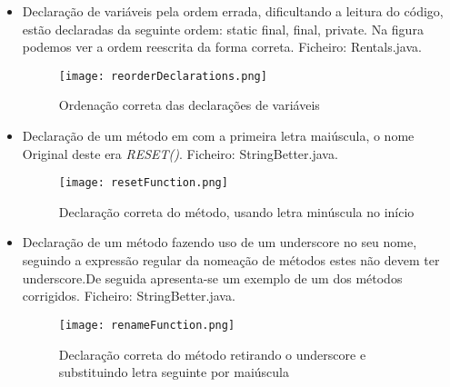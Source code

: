 \begin{itemize}
\item Declaração de variáveis pela ordem errada, dificultando a leitura do código, estão declaradas da seguinte ordem: static final, final, private. Na figura podemos ver a ordem reescrita da forma correta. \newline
 Ficheiro: Rentals.java.\newline


\begin{figure}[H]

  \centering

  \texttt{[image: reorderDeclarations.png]}

  \caption {Ordenação correta das declarações de variáveis}

  \label {fig23}

\end{figure}

\end{itemize}

\begin{itemize}
\item Declaração de um método em com a primeira letra maiúscula, o nome Original deste era \textit{RESET()}. \newline
 Ficheiro: StringBetter.java.\newline


\begin{figure}[H]

  \centering

  \texttt{[image: resetFunction.png]}

  \caption {Declaração correta do método, usando letra minúscula no início}

  \label {fig24}

\end{figure}

\end{itemize}

\begin{itemize}
\item Declaração de um método fazendo uso de um underscore no seu nome, seguindo a expressão regular da nomeação de métodos estes não devem ter underscore.De seguida apresenta-se um exemplo de um dos métodos corrigidos. \newline
 Ficheiro: StringBetter.java.\newline


\begin{figure}[H]

  \centering

  \texttt{[image: renameFunction.png]}

  \caption {Declaração correta do método retirando o underscore e substituindo letra seguinte por maiúscula}

  \label {fig25}

\end{figure}

\end{itemize}

